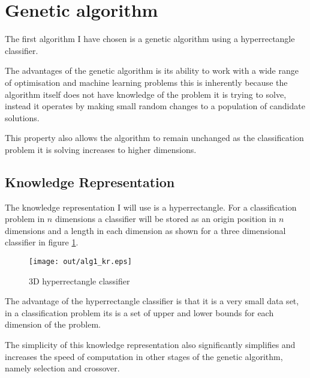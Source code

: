 \documentclass[a4paper]{article}
\title{\DOCTITLE}
\author{\DOCAUTHOR}
\date{\DOCDATE}
\begin{document}
\maketitle

\begin{abstract}
  This document describes the choices I have made for the two nature inspired
  algorithms, their parameters and knowledge representation that will be used to
  solve the given classification problem.
\end{abstract}

\section{Genetic algorithm}

The first algorithm I have chosen is a genetic algorithm using a hyperrectangle
classifier.

The advantages of the genetic algorithm is its ability to work with a wide range
of optimisation and machine learning problems this is inherently because the
algorithm itself does not have knowledge of the problem it is trying to solve,
instead it operates by making small random changes to a population of candidate
solutions.

This property also allows the algorithm to remain unchanged as the
classification problem it is solving increases to higher dimensions.

\subsection{Knowledge Representation}

The knowledge representation I will use is a hyperrectangle. For a
classification problem in $n$ dimensions a classifier will be stored as an
origin position in $n$ dimensions and a length in each dimension as shown for a
three dimensional classifier in figure \ref{fig:alg1_kr}.

\begin{figure}[h!]
  \centering
  \texttt{[image: out/alg1\_kr.eps]}
  \caption{3D hyperrectangle classifier}
  \label{fig:alg1_kr}
\end{figure}

The advantage of the hyperrectangle classifier is that it is a very small data
set, in a classification problem its is a set of upper and lower bounds for each
dimension of the problem.

The simplicity of this knowledge representation also significantly simplifies
and increases the speed of computation in other stages of the genetic algorithm,
namely selection and crossover.
\end{document}

